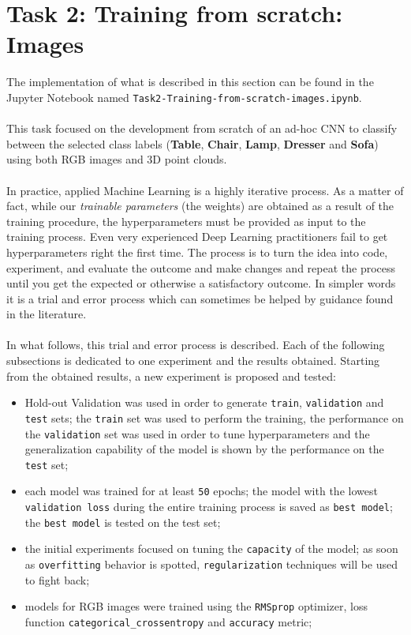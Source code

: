 \documentclass[11pt,a4paper]{article}
\begin{document}
\newpage
\section{Task 2: Training from scratch: Images}
The implementation of what is described in this section can be found in the Jupyter Notebook named \texttt{Task2-Training-from-scratch-images.ipynb}.\\
\\
This task focused on the development from scratch of an ad-hoc CNN to classify between the selected class labels (\textbf{Table}, \textbf{Chair}, \textbf{Lamp}, \textbf{Dresser} and \textbf{Sofa}) using both RGB images and 3D point clouds.\\
\\
In practice, applied Machine Learning is a highly iterative process. As a matter of fact, while our \textit{trainable parameters} (the weights) are obtained as a result of the training procedure, the hyperparameters must be provided as input to the training process. Even very experienced Deep Learning practitioners fail to get hyperparameters right the first time. The process is to turn the idea into code, experiment, and evaluate the outcome and make changes and repeat the process until you get the expected or otherwise a satisfactory outcome. In simpler words it is a trial and error process which can sometimes be helped by guidance found in the literature.\\
\\
In what follows, this trial and error process is described. Each of the following subsections is dedicated to one experiment and the results obtained. Starting from the obtained results, a new experiment is proposed and tested:
\begin{itemize}
    \item Hold-out Validation was used in order to generate \texttt{train}, \texttt{validation} and \texttt{test} sets; the \texttt{train} set was used to perform the training, the performance on the \texttt{validation} set was used in order to tune hyperparameters and the generalization capability of the model is shown by the performance on the \texttt{test} set;
    \item each model was trained for at least \texttt{50} epochs; the model with the lowest \texttt{validation loss} during the entire training process is saved as \texttt{best model}; the \texttt{best model} is tested on the test set;
    \item the initial experiments focused on tuning the \texttt{capacity} of the model; as soon as \texttt{overfitting} behavior is spotted, \texttt{regularization} techniques will be used to fight back;
    \item models for RGB images were trained using the \texttt{RMSprop} optimizer, loss function \texttt{categorical\_crossentropy} and \texttt{accuracy} metric;
\end{itemize}
\end{document}
